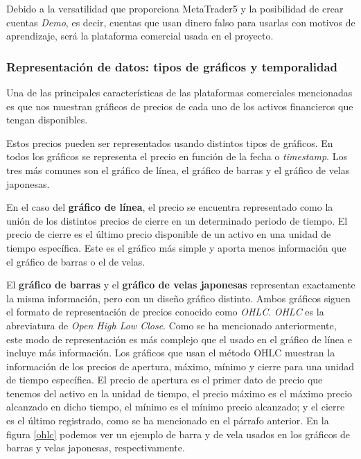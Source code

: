 Debido a la versatilidad que proporciona MetaTrader5 y la posibilidad de crear cuentas \textit{Demo}, es decir, cuentas que usan dinero falso para usarlas con motivos de aprendizaje, será la plataforma comercial usada en el proyecto.

\subsubsection{Representación de datos: tipos de gráficos y temporalidad}

Una de las principales características de las plataformas comerciales mencionadas es que nos muestran gráficos de precios de cada uno de los activos financieros que tengan disponibles. \newline

Estos precios pueden ser representados usando distintos tipos de gráficos. En todos los gráficos se representa el precio en función de la fecha o \textit{timestamp}. Los tres más comunes son el gráfico de línea, el gráfico de barras y el gráfico de velas japonesas. \newline

En el caso del \textbf{gráfico de línea}, el precio se encuentra representado como la unión de los distintos precios de cierre en un determinado periodo de tiempo. El precio de cierre es el último precio disponible de un activo en una unidad de tiempo específica. Este es el gráfico más simple y aporta menos información que el gráfico de barras o el de velas. \newline

El \textbf{gráfico de barras} y el \textbf{gráfico de velas japonesas} representan exactamente la misma información, pero con un diseño gráfico distinto. Ambos gráficos siguen el formato de representación de precios conocido como \textit{OHLC}. \textit{OHLC} es la abreviatura de \textit{Open High Low Close}. Como se ha mencionado anteriormente, este modo de representación es más complejo que el usado en el gráfico de línea e incluye más información. Los gráficos que usan el método OHLC muestran la información de los precios de apertura, máximo, mínimo y cierre para una unidad de tiempo específica. El precio de apertura es el primer dato de precio que tenemos del activo en la unidad de tiempo, el precio máximo es el máximo precio alcanzado en dicho tiempo, el mínimo es el mínimo precio alcanzado; y el cierre es el último registrado, como se ha mencionado en el párrafo anterior. En la figura \ref{ohlc} podemos ver un ejemplo de barra y de vela usados en los gráficos de barras y velas japonesas, respectivamente. \newline

